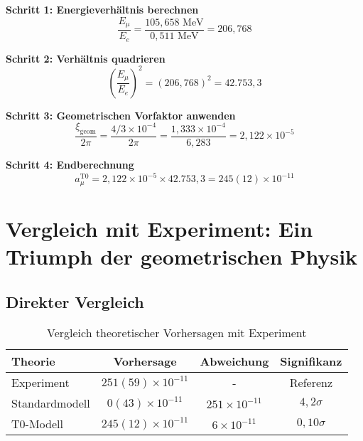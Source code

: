 \documentclass[12pt,a4paper]{report}
\newcommand{\xigeom}{\xi_{\text{geom}}}   %
\newcommand{\Ee}{E_e}                     %
\newcommand{\Emu}{E_\mu}                  %
\begin{document}
	\textbf{Schritt 1: Energieverhältnis berechnen}
	\begin{equation}
		\frac{\Emu}{\Ee} = \frac{105,658 \text{ MeV}}{0,511 \text{ MeV}} = 206,768
		\label{eq:energy_ratio}
	\end{equation}
	
	\textbf{Schritt 2: Verhältnis quadrieren}
	\begin{equation}
		\left(\frac{\Emu}{\Ee}\right)^2 = (206,768)^2 = 42.753,3
		\label{eq:energy_ratio_squared}
	\end{equation}
	
	\textbf{Schritt 3: Geometrischen Vorfaktor anwenden}
	\begin{equation}
		\frac{\xigeom}{2\pi} = \frac{4/3 \times 10^{-4}}{2\pi} = \frac{1,333 \times 10^{-4}}{6,283} = 2,122 \times 10^{-5}
		\label{eq:geometric_prefactor}
	\end{equation}
	
	\textbf{Schritt 4: Endberechnung}
	\begin{equation}
		a_\mu^{\text{T0}} = 2,122 \times 10^{-5} \times 42.753,3 = 245(12) \times 10^{-11}
		\label{eq:t0_final}
	\end{equation}
	
	\section{Vergleich mit Experiment: Ein Triumph der geometrischen Physik}
	\label{sec:comparison_experiment}
	
	\subsection{Direkter Vergleich}
	\label{subsec:direct_comparison}
	
	\begin{table}[H]
		\centering
		\caption{Vergleich theoretischer Vorhersagen mit Experiment}
		\begin{tabular}{@{}lccc@{}}
			\toprule
			\textbf{Theorie} & \textbf{Vorhersage} & \textbf{Abweichung} & \textbf{Signifikanz} \\
			\midrule
			Experiment & $251(59) \times 10^{-11}$ & - & Referenz \\
			Standardmodell & $0(43) \times 10^{-11}$ & $251 \times 10^{-11}$ & $4,2\sigma$ \\
			T0-Modell & $245(12) \times 10^{-11}$ & $6 \times 10^{-11}$ & $0,10\sigma$ \\
			\bottomrule
		\end{tabular}
	\end{table}
	
\end{document}
